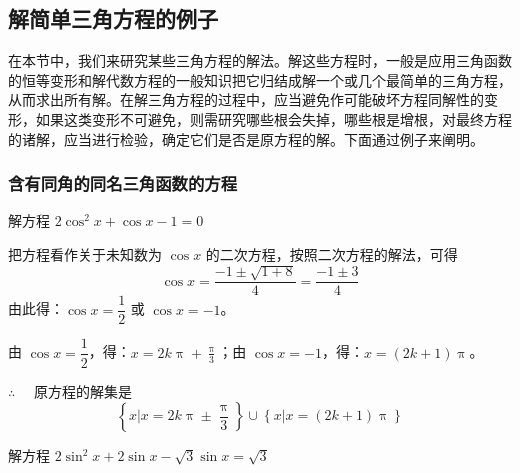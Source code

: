 \subsection{解简单三角方程的例子}
在本节中，我们来研究某些三角方程的解法。解这些方程时，一般是应用三角函数的恒等变形和解代数方程的一般知识把它归结成解一个或几个最简单的三角方程，从而求出所有解。在解三角方程的过程中，应当避免作可能破坏方程同解性的变形，如果这类变形不可避免，则需研究哪些根会失掉，哪些根是增根，对最终方程的诸解，应当进行检验，确定它们是否是原方程的解。下面通过例子来阐明。

\subsubsection{含有同角的同名三角函数的方程}
\begin{example}
  解方程 $2\cos^2x+\cos x-1=0$
\end{example}

\begin{solution}
把方程看作关于未知数为 $\cos x$ 的二次方程，按照二次方程的解法，可得
\[\cos x=\frac{-1\pm\sqrt{1+8}}{4}=\frac{-1\pm 3}{4}\]
由此得：$\cos x=\dfrac{1}{2}$ 或 $\cos x=-1$。

由 $\cos x=\dfrac{1}{2}$，得：$x=2k\uppi+\frac{\uppi}{3}$；由 $\cos x=-1$，得：$x=(2k+1)\uppi$。

$\therefore\quad $ 原方程的解集是
\[\left\{x\big| x=2k\uppi\pm \frac{\uppi}{3}\right\}\cup \left\{x\big| x=(2k+1)\uppi \right\}\]
\end{solution}

\begin{example}
  解方程 $2\sin^2x+2\sin x-\sqrt{3}\sin x=\sqrt{3}$
\end{example}

